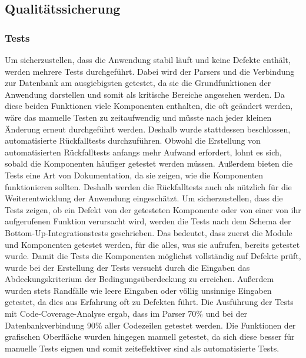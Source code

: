 \subsection{Qualitätssicherung}\label{section:qualitaetssicherung}
%
%
%
%
\subsubsection{Tests}
Um sicherzustellen, dass die Anwendung stabil läuft und keine Defekte enthält, werden mehrere Tests durchgeführt. %
Dabei wird der Parsers und die Verbindung zur Datenbank am ausgiebigsten getestet, da sie die Grundfunktionen der Anwendung darstellen und somit als kritische Bereiche angesehen werden. %
Da diese beiden Funktionen viele Komponenten enthalten, die oft geändert werden, wäre das manuelle Testen zu zeitaufwendig und müsste nach jeder kleinen Änderung erneut durchgeführt werden. %
	Deshalb wurde stattdessen beschlossen, automatisierte Rückfalltests durchzuführen. %
		Obwohl die Erstellung von automatisierten Rückfalltests anfangs mehr Aufwand erfordert, lohnt es sich, sobald die Komponenten häufiger getestet werden müssen. Außerdem bieten die Tests eine Art von Dokumentation, da sie zeigen, wie die Komponenten funktionieren sollten. Deshalb werden die Rückfalltests auch als nützlich für die Weiterentwicklung der Anwendung eingeschätzt.\newline%
Um sicherzustellen, dass die Tests zeigen, ob ein Defekt von der getesteten Komponente oder von einer von ihr aufgerufenen Funktion verursacht wird, werden die Tests nach dem Schema der Bottom-Up-Integrationstests geschrieben. Das bedeutet, dass zuerst die Module und Komponenten getestet werden, für die alles, was sie aufrufen, bereits getestet wurde.\newline%
Damit die Tests die Komponenten möglichst vollständig auf Defekte prüft, wurde bei der Erstellung der Tests versucht durch die Eingaben das Abdeckungskriterium der Bedingungsüberdeckung zu erreichen. Außerdem wurden stets Randfälle wie leere Eingaben oder völlig unsinnige Eingaben getestet, da dies aus Erfahrung oft zu Defekten führt.\newline%
Die Ausführung der Tests mit Code-Coverage-Analyse ergab, dass im Parser 70\% und bei der Datenbankverbindung 90\% aller Codezeilen getestet werden.\newline%
Die Funktionen der grafischen Oberfläche wurden hingegen manuell getestet, da sich diese besser für manuelle Tests eignen und somit zeiteffektiver sind als automatisierte Tests.%
%
%
%
%
%
